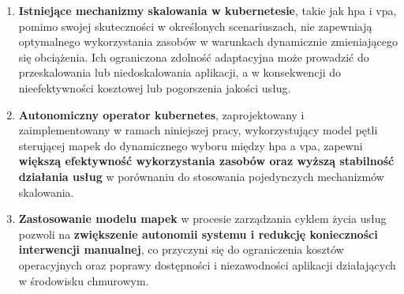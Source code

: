 \begin{enumerate}
    \item \textbf{Istniejące mechanizmy skalowania w \Gls{kubernetes}ie}, takie jak \gls{hpa} i \gls{vpa}, pomimo swojej skuteczności w określonych scenariuszach, nie zapewniają optymalnego wykorzystania zasobów w warunkach dynamicznie zmieniającego się obciążenia. Ich ograniczona zdolność adaptacyjna może prowadzić do przeskalowania lub niedoskalowania aplikacji, a w konsekwencji do nieefektywności kosztowej lub pogorszenia jakości usług.
    
    \item \textbf{Autonomiczny operator \Gls{kubernetes}}, zaprojektowany i zaimplementowany w ramach niniejszej pracy, wykorzystujący model pętli sterującej \gls{mapek} do dynamicznego wyboru między \gls{hpa} a \gls{vpa}, zapewni \textbf{większą efektywność wykorzystania zasobów oraz wyższą stabilność działania usług} w porównaniu do stosowania pojedynczych mechanizmów skalowania.
    
    \item \textbf{Zastosowanie modelu \gls{mapek}} w procesie zarządzania cyklem życia usług pozwoli na \textbf{zwiększenie autonomii systemu i redukcję konieczności interwencji manualnej}, co przyczyni się do ograniczenia kosztów operacyjnych oraz poprawy dostępności i niezawodności aplikacji działających w środowisku chmurowym.
\end{enumerate}


